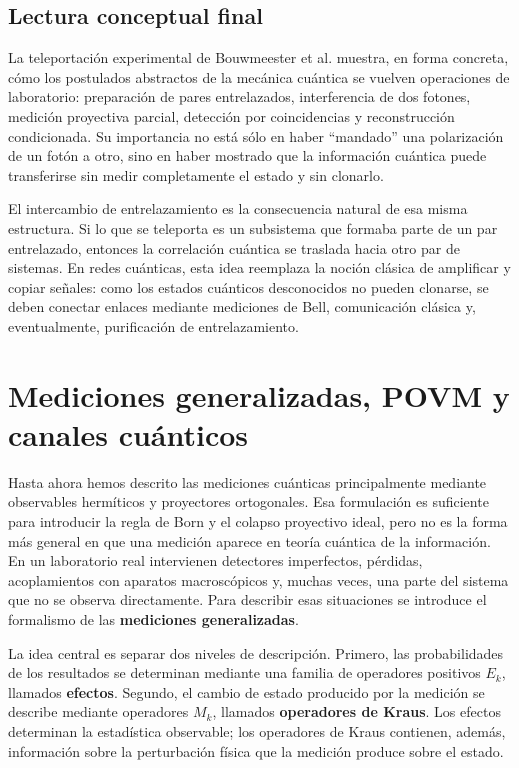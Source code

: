 \documentclass[12pt,a4paper]{article}
\theoremstyle{definition}
\theoremstyle{plain}
\theoremstyle{remark}
\begin{document}
\subsection{Lectura conceptual final}

La teleportación experimental de Bouwmeester et al. muestra, en forma concreta, cómo los postulados abstractos de la mecánica cuántica se vuelven operaciones de laboratorio: preparación de pares entrelazados, interferencia de dos fotones, medición proyectiva parcial, detección por coincidencias y reconstrucción condicionada. Su importancia no está sólo en haber ``mandado'' una polarización de un fotón a otro, sino en haber mostrado que la información cuántica puede transferirse sin medir completamente el estado y sin clonarlo.

El intercambio de entrelazamiento es la consecuencia natural de esa misma estructura. Si lo que se teleporta es un subsistema que formaba parte de un par entrelazado, entonces la correlación cuántica se traslada hacia otro par de sistemas. En redes cuánticas, esta idea reemplaza la noción clásica de amplificar y copiar señales: como los estados cuánticos desconocidos no pueden clonarse, se deben conectar enlaces mediante mediciones de Bell, comunicación clásica y, eventualmente, purificación de entrelazamiento.

\newpage

\section{Mediciones generalizadas, POVM y canales cuánticos}\label{sec:povm-canales}

Hasta ahora hemos descrito las mediciones cuánticas principalmente mediante observables hermíticos y proyectores ortogonales. Esa formulación es suficiente para introducir la regla de Born y el colapso proyectivo ideal, pero no es la forma más general en que una medición aparece en teoría cuántica de la información. En un laboratorio real intervienen detectores imperfectos, pérdidas, acoplamientos con aparatos macroscópicos y, muchas veces, una parte del sistema que no se observa directamente. Para describir esas situaciones se introduce el formalismo de las \textbf{mediciones generalizadas}.

La idea central es separar dos niveles de descripción. Primero, las probabilidades de los resultados se determinan mediante una familia de operadores positivos $E_k$, llamados \textbf{efectos}. Segundo, el cambio de estado producido por la medición se describe mediante operadores $M_k$, llamados \textbf{operadores de Kraus}. Los efectos determinan la estadística observable; los operadores de Kraus contienen, además, información sobre la perturbación física que la medición produce sobre el estado.
\end{document}
